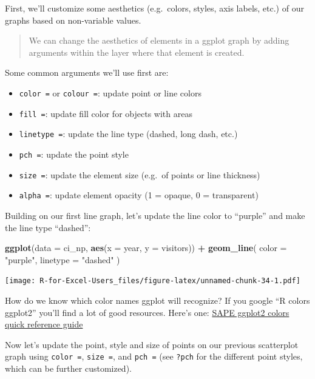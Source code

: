 \documentclass[]{book}
\newenvironment{Shaded}{\begin{snugshade}}{\end{snugshade}}
\newcommand{\DataTypeTok}[1]{\textcolor[rgb]{0.13,0.29,0.53}{#1}}
\newcommand{\KeywordTok}[1]{\textcolor[rgb]{0.13,0.29,0.53}{\textbf{#1}}}
\newcommand{\NormalTok}[1]{#1}
\newcommand{\OperatorTok}[1]{\textcolor[rgb]{0.81,0.36,0.00}{\textbf{#1}}}
\newcommand{\StringTok}[1]{\textcolor[rgb]{0.31,0.60,0.02}{#1}}
\providecommand{\tightlist}{%
  \setlength{\itemsep}{0pt}\setlength{\parskip}{0pt}}
\begin{document}
First, we'll customize some aesthetics (e.g.~colors, styles, axis labels, etc.) of our graphs based on non-variable values.

\begin{quote}
We can change the aesthetics of elements in a ggplot graph by adding arguments within the layer where that element is created.
\end{quote}

Some common arguments we'll use first are:

\begin{itemize}
\tightlist
\item
  \texttt{color\ =} or \texttt{colour\ =}: update point or line colors
\item
  \texttt{fill\ =}: update fill color for objects with areas
\item
  \texttt{linetype\ =}: update the line type (dashed, long dash, etc.)
\item
  \texttt{pch\ =}: update the point style
\item
  \texttt{size\ =}: update the element size (e.g.~of points or line thickness)
\item
  \texttt{alpha\ =}: update element opacity (1 = opaque, 0 = transparent)
\end{itemize}

Building on our first line graph, let's update the line color to ``purple'' and make the line type ``dashed'':

\begin{Shaded}
\begin{Highlighting}[]
\KeywordTok{ggplot}\NormalTok{(}\DataTypeTok{data =}\NormalTok{ ci_np, }\KeywordTok{aes}\NormalTok{(}\DataTypeTok{x =}\NormalTok{ year, }\DataTypeTok{y =}\NormalTok{ visitors)) }\OperatorTok{+}
\StringTok{  }\KeywordTok{geom_line}\NormalTok{(}
    \DataTypeTok{color =} \StringTok{"purple"}\NormalTok{,}
    \DataTypeTok{linetype =} \StringTok{"dashed"}
\NormalTok{  )}
\end{Highlighting}
\end{Shaded}

\texttt{[image: R-for-Excel-Users\_files/figure-latex/unnamed-chunk-34-1.pdf]}

How do we know which color names ggplot will recognize? If you google ``R colors ggplot2'' you'll find a lot of good resources. Here's one: \href{http://sape.inf.usi.ch/quick-reference/ggplot2/colour}{SAPE ggplot2 colors quick reference guide}

Now let's update the point, style and size of points on our previous scatterplot graph using \texttt{color\ =}, \texttt{size\ =}, and \texttt{pch\ =} (see \texttt{?pch} for the different point styles, which can be further customized).
\end{document}
